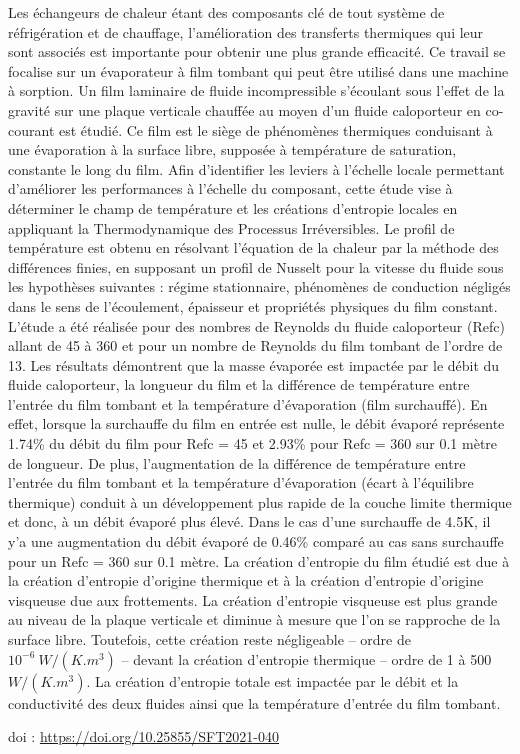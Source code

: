 {\normalsize
Les échangeurs de chaleur étant des composants clé de tout système de réfrigération et de chauffage, l'amélioration des transferts thermiques qui leur sont associés est importante pour obtenir une plus grande efficacité. Ce travail se focalise sur un évaporateur à film tombant qui peut être utilisé dans une machine à sorption. Un film laminaire de fluide incompressible s'écoulant sous l'effet de la gravité sur une plaque verticale chauffée au moyen d'un fluide caloporteur en co-courant est étudié. Ce film est le siège de phénomènes thermiques conduisant à une évaporation à la surface libre, supposée à température de saturation, constante le long du film. Afin d'identifier les leviers à l'échelle locale permettant d'améliorer les performances à l'échelle du composant, cette étude vise à déterminer le champ de température et les créations d'entropie locales en appliquant la Thermodynamique des Processus Irréversibles. Le profil de température est obtenu en résolvant l'équation de la chaleur par la méthode des différences finies, en supposant un profil de Nusselt pour la vitesse du fluide sous les hypothèses suivantes : régime stationnaire, phénomènes de conduction négligés dans le sens de l'écoulement, épaisseur et propriétés physiques du film constant. L'étude a été réalisée pour des nombres de Reynolds du fluide caloporteur (Refc) allant de 45 à 360 et pour un nombre de Reynolds du film tombant de l'ordre de 13. Les résultats démontrent que la masse évaporée est impactée par le débit du fluide caloporteur, la longueur du film et  la différence de température entre l'entrée du film tombant et la température d'évaporation (film surchauffé). En effet, lorsque la surchauffe du film en entrée est nulle, le débit évaporé représente 1.74\% du débit du film pour Refc = 45 et 2.93\% pour Refc = 360 sur 0.1 mètre de longueur. De plus, l'augmentation de la différence de température entre l'entrée du film tombant et la température d'évaporation (écart à l'équilibre thermique) conduit à un développement plus rapide de la couche limite thermique et donc, à un débit évaporé plus élevé. Dans le cas d'une surchauffe de 4.5K, il y'a une augmentation du débit évaporé de 0.46\% comparé au cas sans surchauffe pour un Refc = 360 sur 0.1 mètre. La création d'entropie du film étudié est due à la création d'entropie d'origine thermique et à la création d'entropie d'origine visqueuse due aux frottements. La création d'entropie visqueuse est plus grande au niveau de la plaque verticale et diminue à mesure que l'on se rapproche de la surface libre. Toutefois, cette création reste négligeable – ordre de $\unit{10^{-6}\ W/(K.m^3)}$ – devant la création d'entropie thermique – ordre de 1 à 500 $\unit{W/(K.m^3)}$. La création d'entropie totale est impactée par le débit et la conductivité des deux fluides ainsi que la température d'entrée du film tombant.

 \vfill doi : \url{https://doi.org/10.25855/SFT2021-040}

}
 
